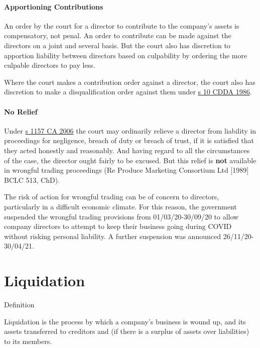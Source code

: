 \documentclass[
]{article}
\newenvironment{env-751485c0-9cbb-4b3b-8497-6bad2ef120e5}
{
    \savenotes\tcolorbox[blanker,breakable,left=5pt,borderline west={2pt}{-4pt}{gold}]
}
{
    \endtcolorbox\spewnotes
}
\begin{document}
\hypertarget{apportioning-contributions}{%
\paragraph{Apportioning
Contributions}\label{apportioning-contributions}}

An order by the court for a director to contribute to the company's
assets is compensatory, not penal. An order to contribute can be made
against the directors on a joint and several basis. But the court also
has discretion to apportion liability between directors based on
culpability by ordering the more culpable directors to pay less.

Where the court makes a contribution order against a director, the court
also has discretion to make a disqualification order against them under
\href{https://www.legislation.gov.uk/ukpga/1986/46/section/10}{s 10 CDDA
1986}.

\hypertarget{no-relief}{%
\paragraph{No Relief}\label{no-relief}}

Under \href{https://www.legislation.gov.uk/ukpga/2006/46/section/1157}{s
1157 CA 2006} the court may ordinarily relieve a director from liability
in proceedings for negligence, breach of duty or breach of trust, if it
is satisfied that they acted honestly and reasonably. And having regard
to all the circumstances of the case, the director ought fairly to be
excused. But this relief is \textbf{not} available in wrongful trading
proceedings (Re Produce Marketing Consortium Ltd {[}1989{]} BCLC 513,
ChD).

The risk of action for wrongful trading can be of concern to directors,
particularly in a difficult economic climate. For this reason, the
government suspended the wrongful trading provisions from
01/03/20-30/09/20 to allow company directors to attempt to keep their
business going during COVID without risking personal liability. A
further suspension was announced 26/11/20-30/04/21.

\hypertarget{liquidation}{%
\section{Liquidation}\label{liquidation}}

\begin{env-751485c0-9cbb-4b3b-8497-6bad2ef120e5}

Definition

Liquidation is the process by which a company's business is wound up,
and its assets transferred to creditors and (if there is a surplus of
assets over liabilities) to its members.

\end{env-751485c0-9cbb-4b3b-8497-6bad2ef120e5}
\end{document}
